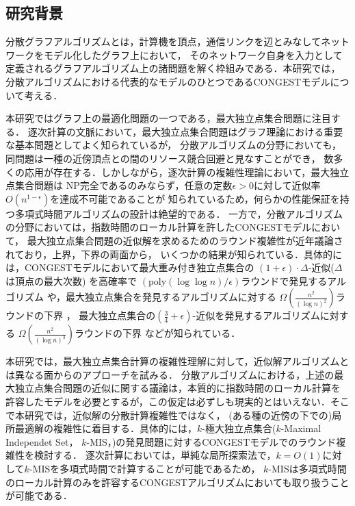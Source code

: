 \documentclass[a4j,twoside]{jarticle}
\newcommand{\CONGEST}{\textsf{CONGEST}}
\theoremstyle{definition}
\begin{document}
\twocolumn[\vspace*{9mm}]
\begin{論文概要}
\setcounter{page}{1}


\section{研究背景}
分散グラフアルゴリズムとは，計算機を頂点，通信リンクを辺とみなしてネットワークをモデル化したグラフ上において，
そのネットワーク自身を入力として定義されるグラフアルゴリズム上の諸問題を解く枠組みである．本研究では，
分散アルゴリズムにおける代表的なモデルのひとつである{{\CONGEST}}モデルについて考える．

本研究ではグラフ上の最適化問題の一つである，最大独立点集合問題に注目する．
逐次計算の文脈において，最大独立点集合問題はグラフ理論における重要な基本問題としてよく知られているが，
分散アルゴリズムの分野においても，同問題は一種の近傍頂点との間のリソース競合回避と見なすことができ，
数多くの応用が存在する．しかしながら，逐次計算の複雑性理論において，最大独立点集合問題は
NP完全であるのみならず，任意の定数$\epsilon > 0$に対して近似率$O(n^{1-\epsilon})$を達成不可能であることが
知られている\cite{haastad1999clique}ため，何らかの性能保証を持つ多項式時間アルゴリズムの設計は絶望的である．
一方で，分散アルゴリズムの分野においては，指数時間のローカル計算を許した{\CONGEST}モデルにおいて，
最大独立点集合問題の近似解を求めるためのラウンド複雑性が近年議論されており，上界，下界の両面から，
いくつかの結果が知られている．具体的には，{\CONGEST}モデルにおいて最大重み付き独立点集合の
$(1 + \epsilon) \cdot \Delta$-近似($\Delta$は頂点の最大次数) を高確率で
$\left(\mathrm{poly}(\log \log n)/\epsilon \right)$ラウンドで発見するアルゴリズム
\cite{kawarabayashi2019improved} や，最大独立点集合を発見するアルゴリズムに対する
$\Omega \left(\frac{n^{2}}{(\log n)^{2}}\right)$ラウンドの下界 \cite{censor2017quadratic}，
最大独立点集合の$(\frac{3}{4} + \epsilon)$-近似を発見するアルゴリズムに対する
$\Omega \left(\frac{n^{2}}{(\log n)^{3}}\right)$ラウンドの下界 \cite{efron2020beyond} などが知られている．

本研究では，最大独立点集合計算の複雑性理解に対して，近似解アルゴリズムとは異なる面からのアプローチを試みる．
分散アルゴリズムにおける，上述の最大独立点集合問題の近似に関する議論は，本質的に指数時間のローカル計算を
許容したモデルを必要とするが，この仮定は必ずしも現実的とはいえない．そこで本研究では，近似解の分散計算複雑性ではなく，
(ある種の近傍の下での)局所最適解の複雑性に着目する．具体的には，$k$-極大独立点集合($k$-Maximal Independet Set， $k$-MIS，\cite{bollobas1991generalised})の発見問題に対する{\CONGEST}モデルでのラウンド複雑性を検討する．
逐次計算においては，単純な局所探索法で，$k=O(1)$に対して$k$-MISを多項式時間で計算することが可能であるため，
$k$-MISは多項式時間のローカル計算のみを許容する{\CONGEST}アルゴリズムにおいても取り扱うことが可能である．


\end{論文概要}
\end{document}
